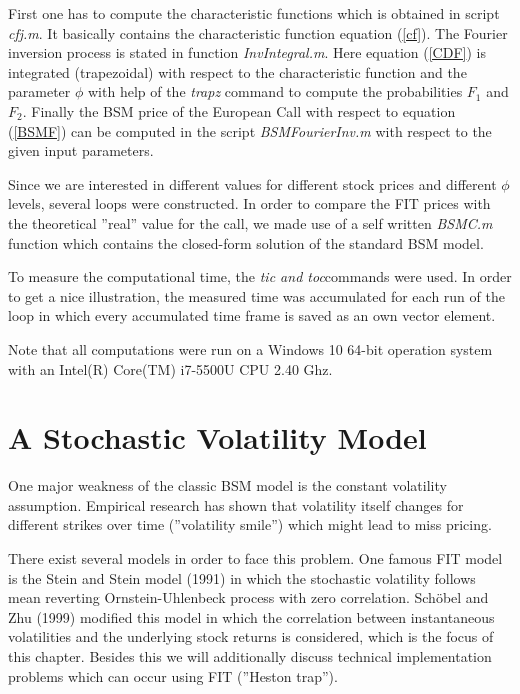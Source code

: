 \documentclass[a4paper,11pt]{article}
\begin{document}
First one has to compute the characteristic functions which is obtained in script \textit{cfj.m}. It basically contains the characteristic function equation (\ref{cf}). The Fourier inversion process is stated in function \textit{InvIntegral.m}. Here equation (\ref{CDF}) is integrated (trapezoidal) with respect to the characteristic function and the parameter $\phi$ with help of the \textit{trapz} command to compute the probabilities $F_1$ and $F_2$. Finally the BSM price of the European Call with respect to equation (\ref{BSMF}) can be computed in the script \textit{BSMFourierInv.m} with respect to the given input parameters.

Since we are interested in different values for different stock prices and different $\phi$ levels, several loops were constructed. In order to compare the FIT prices with the theoretical ''real'' value for the call, we made use of a self written \textit{BSMC.m} function which contains the closed-form solution of the standard BSM model. 

To measure the computational time, the \textit{tic and toc}commands were used. In order to get a nice illustration, the measured time was accumulated for each run of the loop in which every accumulated time frame is saved as an own vector element.
 
Note that all computations were run on a Windows 10 64-bit operation system with an Intel(R) Core(TM) i7-5500U CPU 2.40 Ghz.
\section{A Stochastic Volatility Model}
One major weakness of the classic BSM model is the constant volatility assumption. Empirical research has shown that volatility itself changes for different strikes over time (''volatility smile'') which might lead to miss pricing.

There exist several models in order to face this problem. One famous FIT model is the Stein and Stein model (1991) in which the stochastic volatility follows mean reverting Ornstein-Uhlenbeck process with zero correlation. Sch\"obel and Zhu (1999) modified this model in which the correlation between instantaneous volatilities and the underlying stock returns is considered, which is the focus of this chapter. Besides this we will additionally discuss technical implementation problems which can occur using FIT (''Heston trap'').
\end{document}
